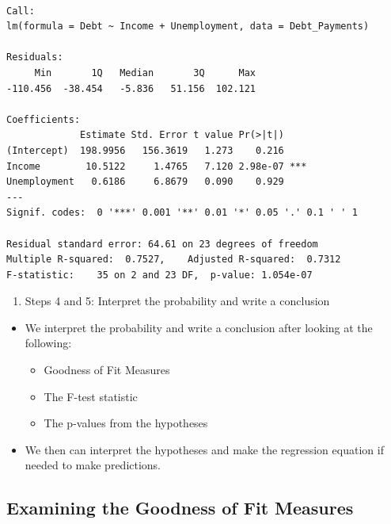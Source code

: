 \documentclass[
  letterpaper,
  DIV=11,
  numbers=noendperiod]{scrreprt}
\providecommand{\tightlist}{%
  \setlength{\itemsep}{0pt}\setlength{\parskip}{0pt}}\usepackage{longtable,booktabs,array}
\begin{document}
\begin{verbatim}

Call:
lm(formula = Debt ~ Income + Unemployment, data = Debt_Payments)

Residuals:
     Min       1Q   Median       3Q      Max 
-110.456  -38.454   -5.836   51.156  102.121 

Coefficients:
             Estimate Std. Error t value Pr(>|t|)    
(Intercept)  198.9956   156.3619   1.273    0.216    
Income        10.5122     1.4765   7.120 2.98e-07 ***
Unemployment   0.6186     6.8679   0.090    0.929    
---
Signif. codes:  0 '***' 0.001 '**' 0.01 '*' 0.05 '.' 0.1 ' ' 1

Residual standard error: 64.61 on 23 degrees of freedom
Multiple R-squared:  0.7527,    Adjusted R-squared:  0.7312 
F-statistic:    35 on 2 and 23 DF,  p-value: 1.054e-07
\end{verbatim}

\begin{enumerate}
\def\labelenumi{\arabic{enumi}.}
\setcounter{enumi}{2}
\tightlist
\item
  Steps 4 and 5: Interpret the probability and write a conclusion
\end{enumerate}

\begin{itemize}
\tightlist
\item
  We interpret the probability and write a conclusion after looking at
  the following:

  \begin{itemize}
  \tightlist
  \item
    Goodness of Fit Measures
  \item
    The F-test statistic
  \item
    The p-values from the hypotheses
  \end{itemize}
\item
  We then can interpret the hypotheses and make the regression equation
  if needed to make predictions.
\end{itemize}

\subsection{Examining the Goodness of Fit
Measures}\label{examining-the-goodness-of-fit-measures-1}
\end{document}
